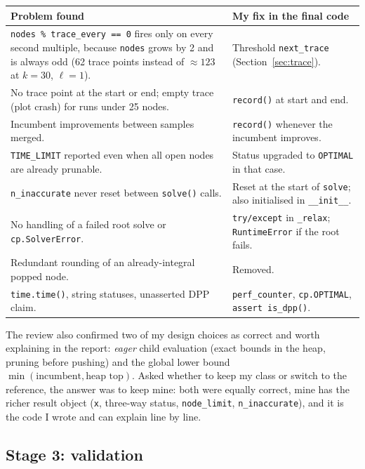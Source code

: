 \documentclass[11pt,a4paper]{article}
\begin{document}
\begin{center}
\small
\begin{tabular}{p{}p{}}
\toprule
Problem found & My fix in the final code\\
\midrule
\texttt{nodes \% trace\_every == 0} fires only on every second multiple, because \texttt{nodes} grows by 2 and is always odd (62 trace points instead of $\approx123$ at $k=30$, $\ell=1$). & Threshold \texttt{next\_trace} (Section~\ref{sec:trace}).\\
No trace point at the start or end; empty trace (plot crash) for runs under 25 nodes. & \texttt{record()} at start and end.\\
Incumbent improvements between samples merged. & \texttt{record()} whenever the incumbent improves.\\
\texttt{TIME\_LIMIT} reported even when all open nodes are already prunable. & Status upgraded to \texttt{OPTIMAL} in that case.\\
\texttt{n\_inaccurate} never reset between \texttt{solve()} calls. & Reset at the start of \texttt{solve}; also initialised in \texttt{\_\_init\_\_}.\\
No handling of a failed root solve or \texttt{cp.SolverError}. & \texttt{try/except} in \texttt{\_relax}; \texttt{RuntimeError} if the root fails.\\
Redundant rounding of an already-integral popped node. & Removed.\\
\texttt{time.time()}, string statuses, unasserted DPP claim. & \texttt{perf\_counter}, \texttt{cp.OPTIMAL}, \texttt{assert is\_dpp()}.\\
\bottomrule
\end{tabular}
\end{center}

The review also confirmed two of my design choices as correct and worth explaining in the report: \emph{eager} child evaluation (exact bounds in the heap, pruning before pushing) and the global lower bound $\min(\text{incumbent},\text{heap top})$. Asked whether to keep my class or switch to the reference, the answer was to keep mine: both were equally correct, mine has the richer result object (\texttt{x}, three-way status, \texttt{node\_limit}, \texttt{n\_inaccurate}), and it is the code I wrote and can explain line by line.

\subsection{Stage 3: validation}
\end{document}
